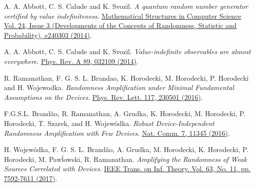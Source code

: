\documentclass[twocolumn, a4paper, superscriptaddress,nofootinbib, accepted=2020-08-07, hyperref]{quantumarticle}
\def\textbf#1{{\bf #1}}
\begin{document}
\begin{thebibliography}{99}
A. A. Abbott, C. S. Calude and K. Svozil.
\textit{A quantum random number generator certified by value indefiniteness}.
\href{https://doi.org/10.1017/S0960129512000692}{Mathematical Structures in Computer Science  Vol. 24, Issue 3 (Developments of the Concepts of Randomness, Statistic and Probability), e240303 (2014)}.


%





A. A. Abbott, C. S. Calude and K. Svozil.
\textit{Value-indefinite observables are almost everywhere}.
\href{https://doi.org/10.1103/PhysRevA.89.032109}{Phys. Rev. A 89, 032109 (2014)}.

R. Ramanathan, F. G. S. L. Brandao, K. Horodecki, M. Horodecki, P. Horodecki and H. Wojewodka.
\textit{Randomness Amplification under Minimal Fundamental Assumptions on the Devices}. \href{https://doi.org/10.1103/PhysRevLett.117.230501}{Phys. Rev. Lett. 117, 230501 (2016)}.


F.G.S.L. Brand\~{a}o, R. Ramanathan, A. Grudka, K. Horodecki, M. Horodecki, P. Horodecki, T. Szarek, and H. Wojew\'{o}dka.
\textit{Robust Device-Independent Randomness Amplification with Few Devices}.
\href{https://doi.org/10.1038/ncomms11345}{Nat. Comm. 7, 11345 (2016)}.

H. Wojew\'{o}dka, F. G. S. L. Brand\~{a}o, A. Grudka, M. Horodecki, K. Horodecki, P. Horodecki, M. Paw\'{l}owski, R. Ramanathan. \textit{Amplifying the Randomness of Weak Sources Correlated with Devices}. \href{10.1109/TIT.2017.2738010}{IEEE Trans. on Inf. Theory. Vol. 63, No. 11, pp. 7592-7611 (2017)}.


\end{thebibliography}
\end{document}
